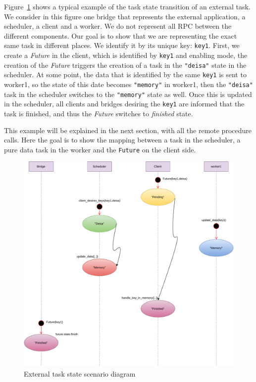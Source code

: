 Figure~\ref{figscatterStates} shows a typical example of the task state transition of an external task. We consider in this figure one bridge that represents the external application, a \dask scheduler, a client and a worker.
We do not represent all RPC between the different components. Our goal is to show that we are representing the exact same task in different places. We identify it by its unique key: \texttt{key1}. First, we create a \textit{Future} in the client, which is identified by \texttt{key1} and enabling \deisa mode, the creation of the \textit{Future} triggers the creation of a task in the \texttt{"deisa"} state in the scheduler. At some point, the data that is identified by the same \texttt{key1} is sent to worker1, so the state of this date becomes \texttt{"memory"} in worker1, then the \texttt{"deisa"} task in the scheduler switches to the \texttt{"memory"} state as well. Once this is updated in the scheduler, all clients and bridges desiring the \texttt{key1} are informed that the task is finished, and thus the \textit{Future} switches to \textit{finished} state. 

This example will be explained in the next section, with all the remote procedure calls. Here the goal is to show the mapping between a task in the scheduler, a pure data task in the worker and the \texttt{Future} on the client side. 

\begin{figure}\centering
\includegraphics[scale=0.5]{figures/NewSacatterAutomateexample.pdf}
\caption{External task state scenario diagram}
\label{figscatterStates}
\end{figure}


